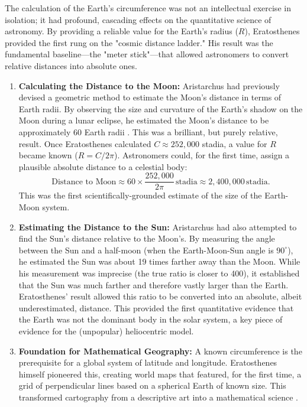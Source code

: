 \documentclass[11pt]{article}
\begin{document}
The calculation of the Earth's circumference was not an intellectual exercise in isolation; it had profound, cascading effects on the quantitative science of astronomy. By providing a reliable value for the Earth's radius ($R$), Eratosthenes provided the first rung on the "cosmic distance ladder." His result was the fundamental baseline—the "meter stick"—that allowed astronomers to convert relative distances into absolute ones.
\begin{enumerate}
    \item  \textbf{Calculating the Distance to the Moon:} Aristarchus had previously devised a geometric method to estimate the Moon's distance in terms of Earth radii. By observing the size and curvature of the Earth's shadow on the Moon during a lunar eclipse, he estimated the Moon’s distance to be approximately 60 Earth radii \cite{Dreyer1953}. This was a brilliant, but purely relative, result. Once Eratosthenes calculated $C \approx 252,000$ stadia, a value for $R$ became known ($R = C / 2\pi$). Astronomers could, for the first time, assign a plausible absolute distance to a celestial body:
    \[
    \text{Distance to Moon} \approx 60 \times \frac{252,000}{2\pi} \, \text{stadia} \approx 2,400,000 \, \text{stadia.}
    \]
    This was the first scientifically-grounded estimate of the size of the Earth-Moon system.

    \item  \textbf{Estimating the Distance to the Sun:} Aristarchus had also attempted to find the Sun's distance relative to the Moon's. By measuring the angle between the Sun and a half-moon (when the Earth-Moon-Sun angle is $90^{\circ}$), he estimated the Sun was about 19 times farther away than the Moon. While his measurement was imprecise (the true ratio is closer to 400), it established that the Sun was much farther and therefore vastly larger than the Earth. Eratosthenes' result allowed this ratio to be converted into an absolute, albeit underestimated, distance. This provided the first quantitative evidence that the Earth was not the dominant body in the solar system, a key piece of evidence for the (unpopular) heliocentric model.

    \item  \textbf{Foundation for Mathematical Geography:} A known circumference is the prerequisite for a global system of latitude and longitude. Eratosthenes himself pioneered this, creating world maps that featured, for the first time, a grid of perpendicular lines based on a spherical Earth of known size. This transformed cartography from a descriptive art into a mathematical science \cite{Berggren2000}.
\end{enumerate}
\end{document}
